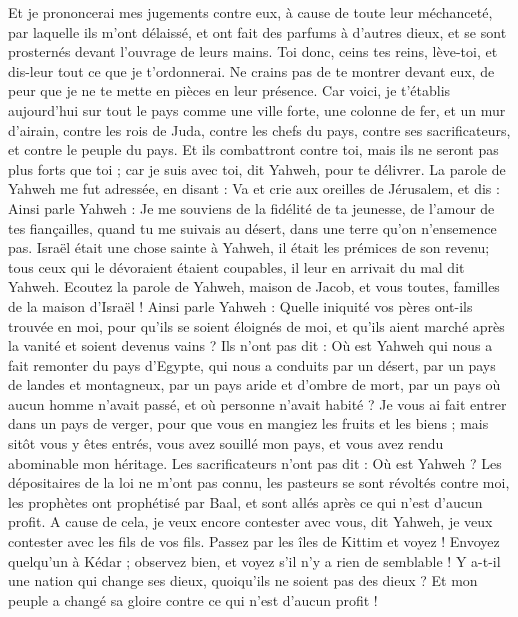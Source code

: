 \begin{multicols}{2}
Et je prononcerai mes jugements contre eux, à cause de toute leur méchanceté, par laquelle ils m'ont délaissé, et ont fait des parfums à d'autres dieux, et se sont prosternés devant l'ouvrage de leurs mains. 
Toi donc, ceins tes reins, lève-toi, et dis-leur tout ce que je t'ordonnerai. Ne crains pas de te montrer devant eux, de peur que je ne te mette en pièces en leur présence.
Car voici, je t'établis aujourd'hui sur tout le pays comme une ville forte, une colonne de fer, et un mur d'airain, contre les rois de Juda, contre les chefs du pays, contre ses sacrificateurs, et contre le peuple du pays.
Et ils combattront contre toi, mais ils ne seront pas plus forts que toi ; car je suis avec toi, dit Yahweh, pour te délivrer.
\VerseOne{}La parole de Yahweh me fut adressée, en disant :
Va et crie aux oreilles de Jérusalem, et dis : Ainsi parle Yahweh : Je me souviens de la fidélité de ta jeunesse, de l'amour de tes fiançailles, quand tu me suivais au désert, dans une terre qu'on n'ensemence pas. 
Israël était une chose sainte à Yahweh, il était les prémices de son revenu; tous ceux qui le dévoraient étaient coupables, il leur en arrivait du mal dit Yahweh.
Ecoutez la parole de Yahweh, maison de Jacob, et vous toutes, familles de la maison d'Israël !
Ainsi parle Yahweh : Quelle iniquité vos pères ont-ils trouvée en moi, pour qu’ils se soient éloignés de moi, et qu’ils aient marché après la vanité et soient devenus vains ?
Ils n'ont pas dit : Où est Yahweh qui nous a fait remonter du pays d'Egypte, qui nous a conduits par un désert, par un pays de landes et montagneux, par un pays aride et d'ombre de mort, par un pays où aucun homme n'avait passé, et où personne n'avait habité ? 
Je vous ai fait entrer dans un pays de verger, pour que vous en mangiez les fruits et les biens ; mais sitôt vous y êtes entrés, vous avez souillé mon pays, et vous avez rendu abominable mon héritage.
Les sacrificateurs n'ont pas dit : Où est Yahweh ? Les dépositaires de la loi ne m'ont pas connu, les pasteurs se sont révoltés contre moi, les prophètes ont prophétisé par Baal, et sont allés après ce qui n'est d'aucun profit.
A cause de cela, je veux encore contester avec vous, dit Yahweh, je veux contester avec les fils de vos fils.
Passez par les îles de Kittim et voyez ! Envoyez quelqu'un à Kédar ; observez bien, et voyez s'il n'y a rien de semblable !
Y a-t-il une nation qui change ses dieux, quoiqu'ils ne soient pas des dieux ? Et mon peuple a changé sa gloire contre ce qui n'est d'aucun profit !

\end{multicols}
